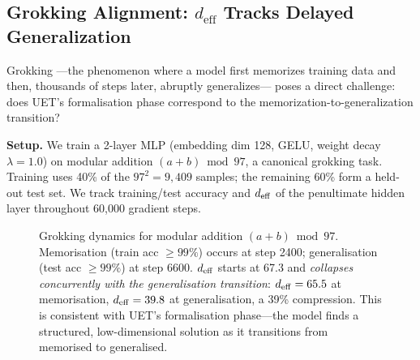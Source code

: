 \subsection{Grokking Alignment: $d_\mathrm{eff}$ Tracks Delayed Generalization}
\label{sec:grokking}

Grokking \citep{power2022grokking}---the phenomenon where a model first
memorizes training data and then, thousands of steps later, abruptly generalizes---
poses a direct challenge: does UET's formalisation phase correspond to the
memorization-to-generalization transition?

\textbf{Setup.}
We train a 2-layer MLP (embedding dim 128, GELU, weight decay $\lambda=1.0$)
on modular addition $(a + b) \bmod 97$, a canonical grokking task.
Training uses 40\% of the $97^2=9{,}409$ samples; the remaining 60\% form
a held-out test set. We track training/test accuracy and $d_{\mathrm{eff}}$ of the penultimate
hidden layer throughout 60{,}000 gradient steps.

\begin{figure}[H]
\centering
{}
\caption{Grokking dynamics for modular addition $(a+b)\bmod 97$. Memorisation
(train acc $\ge 99\%$) occurs at step 2400; generalisation (test acc $\ge 99\%$)
at step 6600. $d_{\mathrm{eff}}$ starts at 67.3 and \emph{collapses concurrently with
the generalisation transition}: $d_{\mathrm{eff}}=65.5$ at memorisation,
$d_{\mathrm{eff}}=39.8$ at generalisation, a 39\% compression.
This is consistent with UET's formalisation phase---the model finds
a structured, low-dimensional solution as it transitions from memorised to generalised.}
\label{fig:grokking}
\end{figure}

